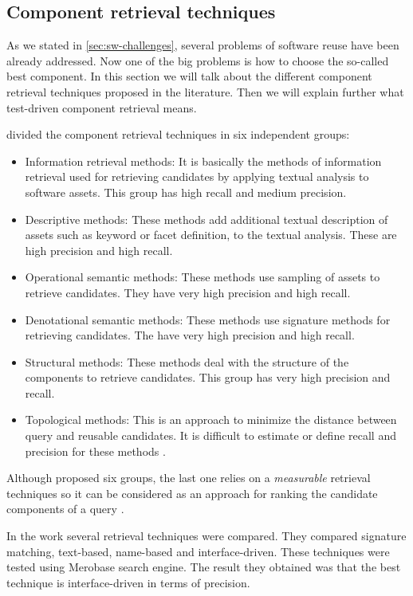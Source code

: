 \subsection{Component retrieval techniques}
As we stated in \ref{sec:sw-challenges}, several problems of software reuse have been already addressed. Now one of the big problems is how to choose the so-called best component. In this section we will talk about the different component retrieval techniques proposed in the literature. Then we will explain further what test-driven component retrieval means.

\cite{Mili1998} divided the component retrieval techniques in six independent groups:

\begin{itemize}
\item Information retrieval methods: It is basically the methods of information retrieval used for retrieving candidates by applying textual analysis to software assets. This group has high recall and medium precision.
\item Descriptive methods: These methods add additional textual description of assets such as keyword or facet definition, to the textual analysis. These are high precision and high recall.
\item Operational semantic methods: These methods use sampling of assets to retrieve candidates. They have very high precision and high recall.
\item Denotational semantic methods: These methods use signature methods for retrieving candidates. The have very high precision and high recall.
\item Structural methods: These methods deal with the structure of the components to retrieve candidates. This group has very high precision and recall.
\item Topological methods: This is an approach to minimize the distance between query and reusable candidates. It is difficult to estimate or define recall and precision for these methods \citep{Mili1998}.
\end{itemize}

Although \cite{Mili1998} proposed six groups, the last one relies on a \textit{measurable} retrieval techniques so it can be considered as an approach for ranking the candidate components of a query \citep{Hummel2007}.

In the work \cite{Hummel2007} several retrieval techniques were compared. They compared signature matching, text-based, name-based and interface-driven. These techniques were tested using Merobase search engine. The result they obtained was that the best technique is interface-driven in terms of precision.

